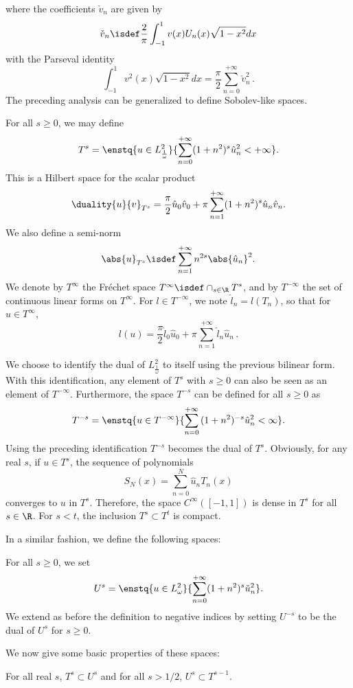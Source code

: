 \documentclass[a4paper]{article}
\begin{document}
	where the coefficients $\check{v}_n$ are given by 
	\[ \check{v}_n \isdef 
	\dfrac{2}{\pi}\displaystyle\int_{-1}^{1} v(x) U_n(x)\sqrt{1-x^2}dx  \]
	with the Parseval identity
	\[ \int_{-1}^{1} v^2(x)\sqrt{1-x^2} dx =  \frac{\pi}{2} \sum_{n=0}^{+\infty}\check{v}_n^2\,.\]
	The preceding analysis can be generalized to define Sobolev-like spaces. 
	\begin{Def}
		For all $s \geq 0$, we may define 
		\[T^s = \enstq{ u \in L^2_\frac{1}{\omega}}{ \sum_{n=0}^{+\infty}(1+n^2)^s \hat{u}_n^2 < + \infty}.\]
		This is a Hilbert space for the scalar product
		\[\duality{u}{v}_{T^s} = \frac{\pi}{2}\hat{u}_0 \hat{v}_0 + \pi\sum_{n=1}^{+\infty}(1+n^2)^s\hat{u}_n \hat{v}_n.\]
		We also define a semi-norm 
		\[\abs{u}_{T^s} \isdef \sum_{n = 1}^{+ \infty}n^{2s} \abs{\hat{u}_n}^2.\]
		We denote by $T^{\infty}$ the Fr\'echet space $T^{\infty} \isdef \displaystyle\cap_{s \in \R} T^s$, and by $T^{-\infty}$ the set of continuous linear forms on $T^{\infty}$. For $l \in T^{-\infty}$, we note $\hat{l}_n = l(T_n)$, so that for $u \in T^{\infty}$, 
		\[l(u) = \frac{\pi}{2}\hat{l}_0 \hat{u}_0 + \pi \sum_{n=1}^{+\infty} \hat{l}_n \hat{u}_n\,.\] 
		
		We choose to identify the dual of $L^2_\frac{1}{\omega}$ to itself using the previous bilinear form.  With this identification, any element of $T^s$ with $s \geq 0$ can also be seen as an element of $T^{-\infty}$.  
		Furthermore, the space $T^{-s}$ can be defined for all $s \geq 0$ as
		\[T^{-s} = \enstq{ u \in T^{-\infty}}{ \sum_{n=0}^{+\infty}{(1 + n^2)^{-s} \hat{u}_n^2} < \infty}.\]
		Using the preceding identification $T^{-s}$ becomes the dual of $T^s$. Obviously, for any real $s$, if $u \in T^s$, the sequence of polynomials 
		\[S_N(x) = \sum_{n=0}^{N} \hat{u}_n T_n(x)\]
		converges to $u$ in $T^s$. Therefore, the space $C^{\infty}([-1,1])$ is dense in $T^s$ for all $s \in \R$. For $s < t$, the inclusion $T^s \subset T^t$ is compact.
	\end{Def}
	\noindent In a similar fashion, we define the following spaces:
	\begin{Def}
		For all $s \geq 0$, we set
		\[U^s = \enstq{u \in L^2_\omega}{ \sum_{n=0}^{+\infty} (1 + n^2)^s\check{u}_n^2}.\]
		We extend as before the definition to negative indices by setting $U^{-s}$ to be the dual of $U^s$ for $s\geq 0$. 
	\end{Def}
	\noindent We now give some basic properties of these spaces:
	\begin{Lem}
		\label{inclusionsTsUs}
		For all real $s$, $T^s \subset U^s$ and for all $s > 1/2$, $U^s \subset T^{s-1}$.
	\end{Lem}
\end{document}
